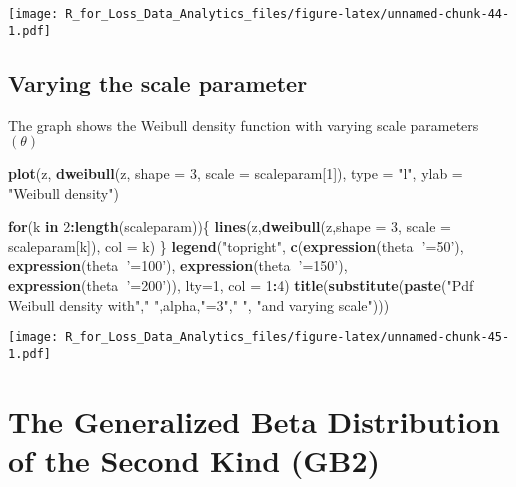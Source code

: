 \documentclass[]{book}
\newenvironment{Shaded}{\begin{snugshade}}{\end{snugshade}}
\newcommand{\KeywordTok}[1]{\textcolor[rgb]{0.13,0.29,0.53}{\textbf{#1}}}
\newcommand{\DataTypeTok}[1]{\textcolor[rgb]{0.13,0.29,0.53}{#1}}
\newcommand{\DecValTok}[1]{\textcolor[rgb]{0.00,0.00,0.81}{#1}}
\newcommand{\StringTok}[1]{\textcolor[rgb]{0.31,0.60,0.02}{#1}}
\newcommand{\ControlFlowTok}[1]{\textcolor[rgb]{0.13,0.29,0.53}{\textbf{#1}}}
\newcommand{\OperatorTok}[1]{\textcolor[rgb]{0.81,0.36,0.00}{\textbf{#1}}}
\newcommand{\NormalTok}[1]{#1}
\theoremstyle{definition}
\theoremstyle{definition}
\theoremstyle{definition}
\theoremstyle{remark}
\begin{document}
\texttt{[image: R\_for\_Loss\_Data\_Analytics\_files/figure-latex/unnamed-chunk-44-1.pdf]}

\subsection{Varying the scale
parameter}\label{varying-the-scale-parameter-2}

The graph shows the Weibull density function with varying scale
parameters \((\theta)\)

\begin{Shaded}
\begin{Highlighting}[]
\KeywordTok{plot}\NormalTok{(z, }\KeywordTok{dweibull}\NormalTok{(z, }\DataTypeTok{shape =} \DecValTok{3}\NormalTok{, }\DataTypeTok{scale =}\NormalTok{ scaleparam[}\DecValTok{1}\NormalTok{]), }\DataTypeTok{type =} \StringTok{"l"}\NormalTok{, }\DataTypeTok{ylab =} \StringTok{"Weibull density"}\NormalTok{)}

\ControlFlowTok{for}\NormalTok{(k }\ControlFlowTok{in} \DecValTok{2}\OperatorTok{:}\KeywordTok{length}\NormalTok{(scaleparam))\{}
  \KeywordTok{lines}\NormalTok{(z,}\KeywordTok{dweibull}\NormalTok{(z,}\DataTypeTok{shape =} \DecValTok{3}\NormalTok{, }\DataTypeTok{scale =}\NormalTok{ scaleparam[k]), }\DataTypeTok{col =}\NormalTok{ k)}
\NormalTok{\}}
\KeywordTok{legend}\NormalTok{(}\StringTok{"topright"}\NormalTok{, }\KeywordTok{c}\NormalTok{(}\KeywordTok{expression}\NormalTok{(theta}\OperatorTok{~}\StringTok{'=50'}\NormalTok{), }\KeywordTok{expression}\NormalTok{(theta}\OperatorTok{~}\StringTok{'=100'}\NormalTok{), }\KeywordTok{expression}\NormalTok{(theta}\OperatorTok{~}\StringTok{'=150'}\NormalTok{), }\KeywordTok{expression}\NormalTok{(theta}\OperatorTok{~}\StringTok{'=200'}\NormalTok{)), }\DataTypeTok{lty=}\DecValTok{1}\NormalTok{, }\DataTypeTok{col =} \DecValTok{1}\OperatorTok{:}\DecValTok{4}\NormalTok{)}
\KeywordTok{title}\NormalTok{(}\KeywordTok{substitute}\NormalTok{(}\KeywordTok{paste}\NormalTok{(}\StringTok{"Pdf Weibull density with"}\NormalTok{,}\StringTok{" "}\NormalTok{,alpha,}\StringTok{"=3"}\NormalTok{,}\StringTok{" "}\NormalTok{, }\StringTok{"and varying scale"}\NormalTok{)))}
\end{Highlighting}
\end{Shaded}

\texttt{[image: R\_for\_Loss\_Data\_Analytics\_files/figure-latex/unnamed-chunk-45-1.pdf]}

\section{The Generalized Beta Distribution of the Second Kind
(GB2)}\label{the-generalized-beta-distribution-of-the-second-kind-gb2}
\end{document}
